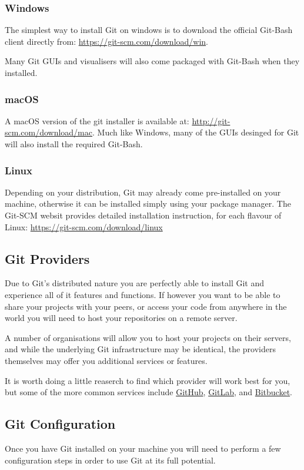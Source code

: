 \documentclass[11pt, a4paper, draft, titlepage]{article}
\begin{document}
\subsubsection*{Windows}
The simplest way to install Git on windows is to download the official Git-Bash
client directly from: \url{https://git-scm.com/download/win}.

Many Git GUIs and visualisers will also come packaged with Git-Bash when they
installed.

\subsubsection*{macOS}
A macOS version of the git installer is available at:
\url{http://git-scm.com/download/mac}.
Much like Windows, many of the GUIs desinged for Git will also install the
required Git-Bash.

\subsubsection*{Linux}
Depending on your distribution, Git may already come pre-installed on your
machine, otherwise it can be installed simply using your package manager.
The Git-SCM websit provides detailed installation instruction, for each
flavour of Linux: \url{https://git-scm.com/download/linux}


\subsection{Git Providers}
Due to Git's distributed nature you are perfectly able to install Git and
experience all of it features and functions. 
If however you want to be able to
share your projects with your peers, or access your code from anywhere in the
world you will need to host your repositories on a remote server.

A number of organisations will allow you to host your projects on their
servers, and while the underlying Git infrastructure may be identical, the
providers themselves may offer you additional services or features.

It is worth doing a little reaserch to find which provider will work best for
you, but some of the more common services include
\href{https://github.com}{GitHub}, \href{https://gitlab.com}{GitLab}, and
\href{https://bitbucket.org}{Bitbucket}.


\subsection{Git Configuration}
Once you have Git installed on your machine you will need to perform a few
configuration steps in order to use Git at its full potential.
\end{document}
